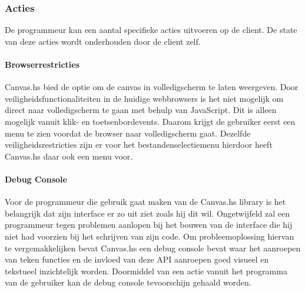 \subsubsection{Acties}
De programmeur kan een aantal specifieke acties uitvoeren op de client. De state van deze acties wordt onderhouden door de client zelf.

\paragraph{Browserrestricties}
Canvas.hs bied de optie om de canvas in volledigscherm te laten weergeven. Door veiligheidsfunctionaliteiten in de huidige webbrowsers is het niet mogelijk om direct naar volledigscherm te gaan met behulp van JavaScript. Dit is alleen mogelijk vanuit klik- en toetsenbordevents. Daarom krijgt de gebruiker eerst een menu te zien voordat de browser naar volledigscherm gaat. Dezelfde veiligheidsrestricties zijn er voor het bestandenselectiemenu hierdoor heeft Canvas.hs daar ook een menu voor.


\paragraph{Debug Console}
Voor de programmeur die gebruik gaat maken van de Canvas.hs library is het belangrijk dat zijn interface er zo uit ziet zoals hij dit wil. Ongetwijfeld zal een programmeur tegen problemen aanlopen bij het bouwen van de interface die hij niet had voorzien bij het schrijven van zijn code. Om probleemoplossing hiervan te vergemakkelijken bevat Canvas.hs een debug console bevat waar het aanroepen van teken functies en de invloed van deze API aanroepen goed visueel en tekstueel inzichtelijk worden. Doormiddel van een actie vanuit het programma van de gebruiker kan de debug console tevoorschijn gehaald worden.